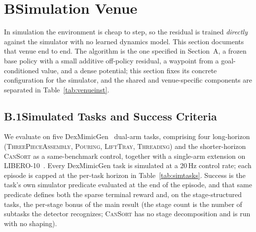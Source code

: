 \documentclass[letterpaper]{article} %
\newcounter{algorithm}
\begin{document}
\section{B\quad Simulation Venue}

In simulation the environment is cheap to step, so the residual is trained
\emph{directly} against the simulator with no learned dynamics model. This section
documents that venue end to end. The algorithm is the one specified in Section~A, a frozen base policy with a small
additive off-policy residual, a waypoint from a goal-conditioned value, and a dense
potential; this section fixes its concrete configuration for the simulator, and the
shared and venue-specific components are separated in Table~\ref{tab:venueinst}.

\subsection{B.1\quad Simulated Tasks and Success Criteria}

We evaluate on five DexMimicGen~\cite{jia2024dexmimicgen,mandlekar2023mimicgen}
dual-arm tasks, comprising four long-horizon (\textsc{ThreePieceAssembly}, \textsc{Pouring},
\textsc{LiftTray}, \textsc{Threading}) and the shorter-horizon \textsc{CanSort} as a
same-benchmark control, together with a single-arm extension on
LIBERO-10~\cite{liu2023libero}. Every DexMimicGen task is simulated at a $20$\,Hz
control rate; each episode is capped at the per-task horizon in
Table~\ref{tab:simtasks}. Success is the task's own simulator predicate evaluated at
the end of the episode, and that same predicate defines both the sparse terminal
reward and, on the stage-structured tasks, the per-stage bonus of the main result
(the stage count is the number of subtasks the detector recognizes; \textsc{CanSort}
has no stage decomposition and is run with no shaping).
\end{document}
